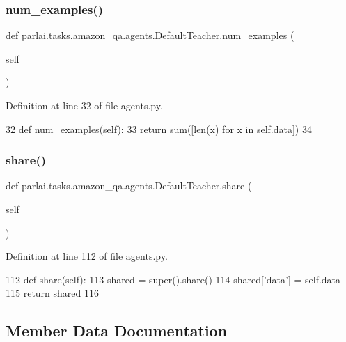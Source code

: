 \subsubsection{\texorpdfstring{num\+\_\+examples()}{num\_examples()}}
{\footnotesize\ttfamily def parlai.\+tasks.\+amazon\+\_\+qa.\+agents.\+Default\+Teacher.\+num\+\_\+examples (\begin{DoxyParamCaption}\item[{}]{self }\end{DoxyParamCaption})}



Definition at line 32 of file agents.\+py.


\begin{DoxyCode}
32     \textcolor{keyword}{def }num\_examples(self):
33         \textcolor{keywordflow}{return} sum([len(x) \textcolor{keywordflow}{for} x \textcolor{keywordflow}{in} self.data])
34 
\end{DoxyCode}
\mbox{\label{classparlai_1_1tasks_1_1amazon__qa_1_1agents_1_1DefaultTeacher_ada0d98ee271a27425e64ce82b9700aa4}} 
\subsubsection{\texorpdfstring{share()}{share()}}
{\footnotesize\ttfamily def parlai.\+tasks.\+amazon\+\_\+qa.\+agents.\+Default\+Teacher.\+share (\begin{DoxyParamCaption}\item[{}]{self }\end{DoxyParamCaption})}



Definition at line 112 of file agents.\+py.


\begin{DoxyCode}
112     \textcolor{keyword}{def }share(self):
113         shared = super().share()
114         shared[\textcolor{stringliteral}{'data'}] = self.data
115         \textcolor{keywordflow}{return} shared
116 \end{DoxyCode}


\subsection{Member Data Documentation}
\mbox{\label{classparlai_1_1tasks_1_1amazon__qa_1_1agents_1_1DefaultTeacher_a0ab774418f9f5f77d354150198212d4e}} 
